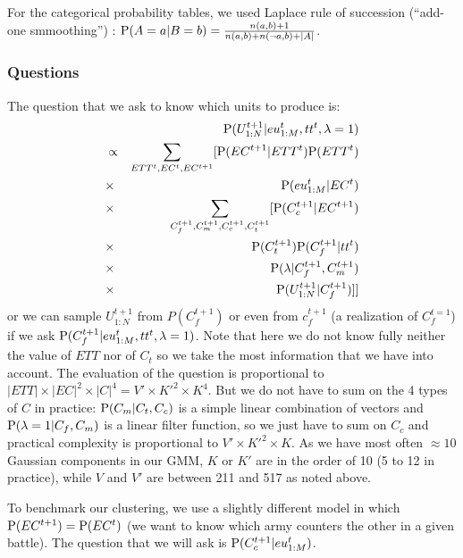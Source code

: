 For the categorical probability tables, we used Laplace rule of succession (``add-one smmoothing'') \cite{Jaynes}: $\mathrm{P}(A=a|B=b)=\frac{n(a,b)+1}{n(a,b)+n(\neg a,b)+|A|}$.

\subsubsection{Questions}
The question that we ask to know which units to produce is:
\begin{eqnarray}
 & & \mathrm{P}(U_{1:N}^{t+1} | eu_{1:M}^t, tt^t, \lambda = 1) \\
 & \propto & \sum_{ETT^t, EC^t, EC^{t+1}}[\mathrm{P}(EC^{t+1}|ETT^t)\mathrm{P}(ETT^t)\\
 & \times & \mathrm{P}(eu_{1:M}^t|EC^t) \\
 & \times & \sum_{C_f^{t+1},C_m^{t+1},C_c^{t+1},C_t^{t+1}}[\mathrm{P}(C_c^{t+1}|EC^{t+1})\\
 & \times & \mathrm{P}(C_{t}^{t+1})\mathrm{P}(C_{f}^{t+1}|tt^{t})\\
 & \times & \mathrm{P}(\lambda|C_{f}^{t+1},C_{m}^{t+1})\\
 & \times & \mathrm{P}(U_{1:N}^{t+1}|C_f^{t+1})]]
\end{eqnarray}
or we can sample $U_{1:N}^{t+1}$ from $P(C_f^{t+1})$ or even from $c_f^{t+1}$ (a realization of $C_f^{t=1}$) if we ask $\mathrm{P}(C_f^{t+1} | eu_{1:M}^t, tt^t, \lambda = 1)$. Note that here we do not know fully neither the value of $ETT$ nor of $C_t$ so we take the most information that we have into account. The evaluation of the question is proportional to $|ETT|\times |EC|^2\times |C|^4 = V'\times K'^2 \times K^4$. But we do not have to sum on the 4 types of $C$ in practice: $\mathrm{P}(C_m|C_t,C_c)$ is a simple linear combination of vectors and $\mathrm{P}(\lambda=1|C_f,C_m)$ is a linear filter function, so we just have to sum on $C_c$ and practical complexity is proportional to $V'\times K'^2 \times K$. As we have most often $\approx 10$ Gaussian components in our GMM, $K$ or $K'$ are in the order of 10 (5 to 12 in practice), while $V$ and $V'$ are between 211 and 517 as noted above.

To benchmark our clustering, we use a slightly different model in which $\mathrm{P}(EC^{t+1})=\mathrm{P}(EC^t)$ (we want to know which army counters the other in a given battle). The question that we will ask is $\mathrm{P}(C_c^{t+1}|eu_{1:M}^t)$.

